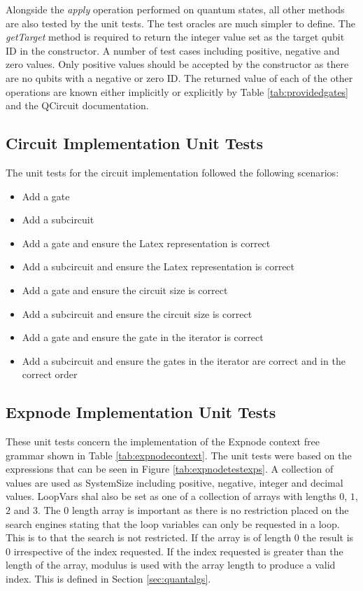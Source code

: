 Alongside the \emph{apply} operation performed on quantum states, all other methods are also tested by the unit tests.
The test oracles are much simpler to define.
The \emph{getTarget} method is required to return the integer value set as the target qubit ID in the constructor.
A number of test cases including positive, negative and zero values.
Only positive values should be accepted by the constructor as there are no qubits with a negative or zero ID.
The returned value of each of the other operations are known either implicitly or explicitly by Table \ref{tab:providedgates} and the QCircuit\cite{QCsite} documentation.

\subsection{Circuit Implementation Unit Tests}
\label{sec:circtests}
The unit tests for the circuit implementation followed the following scenarios:
\begin{itemize}
 \item Add a gate
 \item Add a subcircuit
 \item Add a gate and ensure the Latex representation is correct
 \item Add a subcircuit and ensure the Latex representation is correct
 \item Add a gate and ensure the circuit size is correct
 \item Add a subcircuit and ensure the circuit size is correct
 \item Add a gate and ensure the gate in the iterator is correct
 \item Add a subcircuit and ensure the gates in the iterator are correct and in the correct order
\end{itemize}

\subsection{Expnode Implementation Unit Tests}
These unit tests concern the implementation of the Expnode context free grammar shown in Table \ref{tab:expnodecontext}.
The unit tests were based on the expressions that can be seen in Figure \ref{tab:expnodetestexps}.
A collection of values are used as SystemSize including positive, negative, integer and decimal values.
LoopVars shal also be set as one of a collection of arrays with lengths $0$, $1$, $2$ and $3$.
The $0$ length array is important as there is no restriction placed on the search engines stating that the loop variables can only be requested in a loop.
This is to that the search is not restricted.
If the array is of length $0$ the result is $0$ irrespective of the index requested.
If the index requested is greater than the length of the array, modulus is used with the array length to produce a valid index.
This is defined in Section \ref{sec:quantalgs}.

